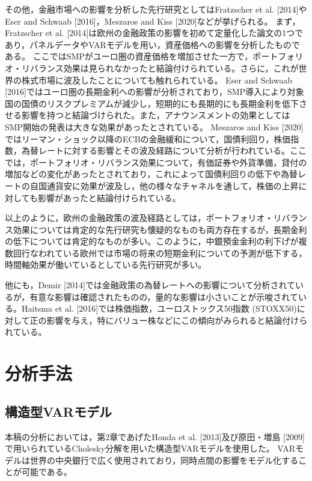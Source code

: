 \documentclass[12pt]{jarticle}
\begin{document}
{その他，金融市場への影響を分析した先行研究としてはFratzscher et al. [2014]やEser and Schwaab [2016]，Meszaros and Kiss [2020]などが挙げられる。
まず，Fratzscher et al. [2014]は欧州の金融政策の影響を初めて定量化した論文の1つであり，パネルデータやVARモデルを用い，資産価格への影響を分析したものである。
ここではSMPがユーロ圏の資産価格を増加させた一方で，ポートフォリオ・リバランス効果は見られなかったと結論付けられている。さらに，これが世界の株式市場に波及したことについても触れられている。
Eser and Schwaab [2016]ではユーロ圏の長期金利への影響が分析されており，SMP導入により対象国の国債のリスクプレミアムが減少し，短期的にも長期的にも長期金利を低下させる影響を持つと結論づけられた。また，アナウンスメントの効果としてはSMP開始の発表は大きな効果があったとされている。
Meszaros and Kiss [2020]ではリーマン・ショック以降のECBの金融緩和について，国債利回り，株価指数，為替レートに対する影響とその波及経路について分析が行われている。ここでは，ポートフォリオ・リバランス効果について，有価証券や外貨準備，貸付の増加などの変化があったとされており，これによって国債利回りの低下や為替レートの自国通貨安に効果が波及し，他の様々なチャネルを通して，株価の上昇に対しても影響があったと結論付けられている。

以上のように，欧州の金融政策の波及経路としては，ポートフォリオ・リバランス効果については肯定的な先行研究も懐疑的なものも両方存在するが，長期金利の低下については肯定的なものが多い。このように，中銀預金金利の利下げが複数回行なわれている欧州では市場の将来の短期金利についての予測が低下する，時間軸効果が働いているとしている先行研究が多い。

他にも，Demir [2014]では金融政策の為替レートへの影響について分析されているが，有意な影響は確認されたものの，量的な影響は小さいことが示唆されている。Haitsma et al. [2016]では株価指数，ユーロストックス50指数 (STOXX50)に対して正の影響を与え，特にバリュー株などにこの傾向がみられると結論付けられている。

\newpage

\section{分析手法}

\subsection{構造型VARモデル}

本稿の分析においては，第2章であげたHonda et al. [2013]及び原田・増島 [2009]で用いられているCholesky分解を用いた構造型VARモデルを使用した。
VARモデルは世界の中央銀行で広く使用されており，同時点間の影響をモデル化することが可能である。

}
\end{document}
